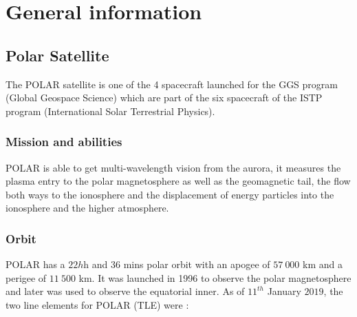 \documentclass[a4paper,12pt,calibri,oneside,openany]{book}
\theoremstyle{break}
\begin{document}
\begin{titlepage}
\begin{center}
\vfill



\end{center}
\end{titlepage}


\frontmatter



\tableofcontents

\mainmatter
\pagestyle{fancy}



\chapter{General information}
\section{Polar Satellite}
The POLAR satellite is one of the 4 spacecraft launched for the GGS program (Global Geospace Science) which are part of the six spacecraft of the ISTP program (International Solar Terrestrial Physics). \\

\subsection{Mission and abilities}
POLAR is able to get multi-wavelength vision from the aurora, it measures the plasma entry to the polar magnetosphere as well as the geomagnetic tail, the flow both ways to the ionosphere and the displacement of energy particles into the ionosphere and the higher atmosphere. \\

\subsection{Orbit}
POLAR has a $22h$h and $36$ mins polar orbit with an apogee of $57\ 000$ km and a perigee of $11\ 500$ km. It was launched in 1996 to observe the polar magnetosphere and later was used to observe the equatorial inner. As of $11^{th}$ January $2019$, the two line elements for POLAR (TLE) were :\\
\end{document}
